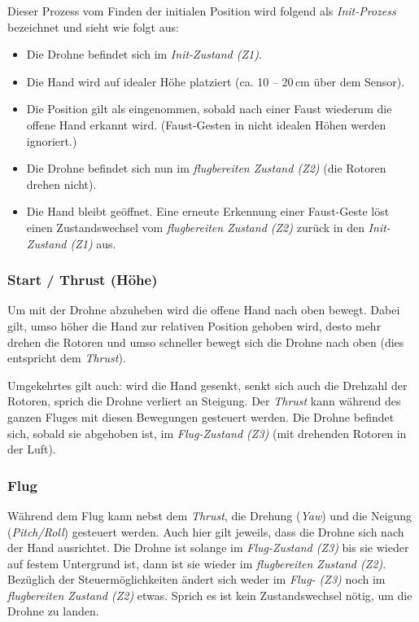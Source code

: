 Dieser Prozess vom Finden der initialen Position wird folgend als \textit{Init-Prozess} bezeichnet und sieht wie folgt aus:

\begin{itemize}
	\item Die Drohne befindet sich im \textit{Init-Zustand (Z1)}.
	\item Die Hand wird auf idealer Höhe platziert (ca. 10 -- 20\,cm über dem Sensor).
	\item Die Position gilt als eingenommen, sobald nach einer Faust wiederum die offene Hand erkannt wird. (Faust-Gesten in nicht idealen Höhen werden ignoriert.)
	\item Die Drohne befindet sich nun im \textit{flugbereiten Zustand (Z2)} (die Rotoren drehen nicht).
	\item Die Hand bleibt geöffnet. Eine erneute Erkennung einer Faust-Geste löst einen Zustandswechsel vom \textit{flugbereiten Zustand (Z2)} zurück in den \textit{Init-Zustand (Z1)} aus.
\end{itemize}

\subsubsection{Start / Thrust (Höhe)}
Um mit der Drohne abzuheben wird die offene Hand nach oben bewegt. Dabei gilt, umso höher die Hand zur relativen Position gehoben wird, desto mehr drehen die Rotoren und umso schneller bewegt sich die Drohne nach oben (dies entspricht dem \textit{Thrust}).

Umgekehrtes gilt auch: wird die Hand gesenkt, senkt sich auch die Drehzahl der Rotoren, sprich die Drohne verliert an Steigung.
Der \textit{Thrust} kann während des ganzen Fluges mit diesen Bewegungen gesteuert werden.
Die Drohne befindet sich, sobald sie abgehoben ist, im \textit{Flug-Zustand (Z3)} (mit drehenden Rotoren in der Luft).

\subsubsection{Flug}
Während dem Flug kann nebst dem \textit{Thrust}, die Drehung (\textit{Yaw}) und die Neigung (\textit{Pitch/Roll}) gesteuert werden.
Auch hier gilt jeweils, dass die Drohne sich nach der Hand ausrichtet.
Die Drohne ist solange im \textit{Flug-Zustand (Z3)} bis sie wieder auf festem Untergrund ist, dann ist sie wieder im \textit{flugbereiten Zustand (Z2)}.
Bezüglich der Steuermöglichkeiten ändert sich weder im \textit{Flug- (Z3)} noch im \textit{flugbereiten Zustand (Z2)} etwas.
Sprich es ist kein Zustandswechsel nötig, um die Drohne zu landen.

